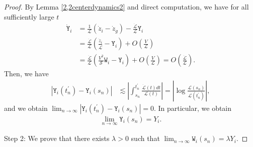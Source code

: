 \documentclass[reqno]{amsart}
\theoremstyle{plain}
\theoremstyle{definition}
\numberwithin{equation}{section}
\begin{document}
\begin{proof}
By Lemma \ref{2,2centerdynamics2} and direct computation, we have for all sufficiently large $t$
\begin{align*}
\dot{\mathtt{Y}}_i&=\frac{1}{\mathcal{L}}\left(\dot{z}_i-\dot{z}_g\right)-\frac{\dot{\mathcal{L}}}{\mathcal{L}}\mathtt{Y}_i
\\
&=\frac{\dot{\mathcal{L}}}{\mathcal{L}}\left(\frac{\dot{z}_i}{\dot{\mathcal{L}}}-\mathtt{Y}_i\right)+O\left(\frac{V}{\mathcal{L}}\right)
\\
&=\frac{\dot{\mathcal{L}}}{\mathcal{L}}\left(\frac{V^2}{\mathcal{S}}\mathtt{W}_i-\mathtt{Y}_i \right)+O\left(\frac{V}{\mathcal{L}}\right)=O\left(\frac{\dot{\mathcal{L}}}{\mathcal{L}}\right).
\end{align*}
Then, we have
\begin{align*}
\left|\mathtt{Y}_i(t_n^{\prime})-\mathtt{Y}_i(s_n)\right|&\lesssim  \left|\int_{s_n}^{t_n^{\prime}}\frac{\dot{\mathcal{L}}(t)dt}{\mathcal{L}(t)} \right|=\left|\log{\frac{\mathcal{L}(s_n)}{\mathcal{L}(t_n^{\prime})}}\right|,
\end{align*}
and we obtain $\lim_{n\to\infty}\left|\mathtt{Y}_i(t_n^{\prime})-\mathtt{Y}_i(s_n)\right|=0$. In particular, we obtain
\begin{align}\label{Ynokyokugen0808}
\lim_{n\to\infty}\mathtt{Y}_i(s_n)=Y_i.
\end{align}


Step 2: We prove that there exists $\lambda>0$ such that $\lim_{n\to\infty}\mathtt{W}_i(s_n)=\lambda Y_i$.


\end{proof}
\end{document}
